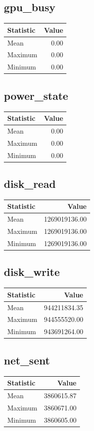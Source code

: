 \documentclass[11pt]{article}
\begin{document}
\subsection{gpu_busy}
\begin{tabular}{lr}
\toprule
Statistic & Value \\
\midrule
Mean & 0.00 \\
Maximum & 0.00 \\
Minimum & 0.00 \\
\bottomrule
\end{tabular}


\subsection{power_state}
\begin{tabular}{lr}
\toprule
Statistic & Value \\
\midrule
Mean & 0.00 \\
Maximum & 0.00 \\
Minimum & 0.00 \\
\bottomrule
\end{tabular}


\subsection{disk_read}
\begin{tabular}{lr}
\toprule
Statistic & Value \\
\midrule
Mean & 1269019136.00 \\
Maximum & 1269019136.00 \\
Minimum & 1269019136.00 \\
\bottomrule
\end{tabular}


\subsection{disk_write}
\begin{tabular}{lr}
\toprule
Statistic & Value \\
\midrule
Mean & 944211834.35 \\
Maximum & 944555520.00 \\
Minimum & 943691264.00 \\
\bottomrule
\end{tabular}


\subsection{net_sent}
\begin{tabular}{lr}
\toprule
Statistic & Value \\
\midrule
Mean & 3860615.87 \\
Maximum & 3860671.00 \\
Minimum & 3860605.00 \\
\bottomrule
\end{tabular}
\end{document}
